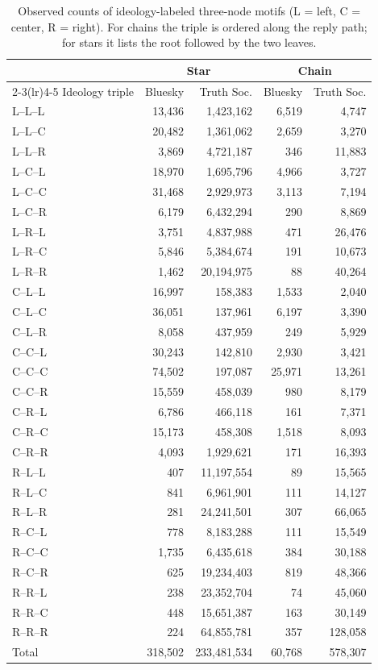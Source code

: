 \documentclass[letterpaper]{article} %
\newcommand{\rev}[1]{{\color{blue}#1}}
\begin{document}
\begin{table}[t]
\centering
\footnotesize
\setlength{\tabcolsep}{3.5pt}
\rev{
\begin{tabular}{lrrrr}
\toprule
 & \multicolumn{2}{c}{Star} & \multicolumn{2}{c}{Chain} \\
\cmidrule(lr){2-3}\cmidrule(lr){4-5}
Ideology triple & Bluesky & Truth Soc. & Bluesky & Truth Soc. \\
\midrule
L--L--L & 13,436 & 1,423,162 & 6,519 & 4,747 \\
L--L--C & 20,482 & 1,361,062 & 2,659 & 3,270 \\
L--L--R & 3,869 & 4,721,187 & 346 & 11,883 \\
L--C--L & 18,970 & 1,695,796 & 4,966 & 3,727 \\
L--C--C & 31,468 & 2,929,973 & 3,113 & 7,194 \\
L--C--R & 6,179 & 6,432,294 & 290 & 8,869 \\
L--R--L & 3,751 & 4,837,988 & 471 & 26,476 \\
L--R--C & 5,846 & 5,384,674 & 191 & 10,673 \\
L--R--R & 1,462 & 20,194,975 & 88 & 40,264 \\
C--L--L & 16,997 & 158,383 & 1,533 & 2,040 \\
C--L--C & 36,051 & 137,961 & 6,197 & 3,390 \\
C--L--R & 8,058 & 437,959 & 249 & 5,929 \\
C--C--L & 30,243 & 142,810 & 2,930 & 3,421 \\
C--C--C & 74,502 & 197,087 & 25,971 & 13,261 \\
C--C--R & 15,559 & 458,039 & 980 & 8,179 \\
C--R--L & 6,786 & 466,118 & 161 & 7,371 \\
C--R--C & 15,173 & 458,308 & 1,518 & 8,093 \\
C--R--R & 4,093 & 1,929,621 & 171 & 16,393 \\
R--L--L & 407 & 11,197,554 & 89 & 15,565 \\
R--L--C & 841 & 6,961,901 & 111 & 14,127 \\
R--L--R & 281 & 24,241,501 & 307 & 66,065 \\
R--C--L & 778 & 8,183,288 & 111 & 15,549 \\
R--C--C & 1,735 & 6,435,618 & 384 & 30,188 \\
R--C--R & 625 & 19,234,403 & 819 & 48,366 \\
R--R--L & 238 & 23,352,704 & 74 & 45,060 \\
R--R--C & 448 & 15,651,387 & 163 & 30,149 \\
R--R--R & 224 & 64,855,781 & 357 & 128,058 \\
\midrule
Total & 318,502 & 233,481,534 & 60,768 & 578,307 \\
\bottomrule
\end{tabular}
}
\caption{\rev{Observed counts of ideology-labeled three-node motifs (L = left, C = center, R = right). For chains the triple is ordered along the reply path; for stars it lists the root followed by the two leaves.}}
\label{tab:motifcounts}
\end{table}
\end{document}
